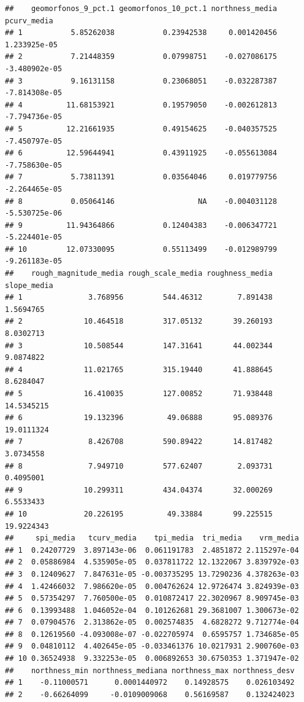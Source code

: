 \documentclass[11pt,]{article}
\begin{document}
\begin{verbatim}
##    geomorfonos_9_pct.1 geomorfonos_10_pct.1 northness_media   pcurv_media
## 1           5.85262038           0.23942538     0.001420456  1.233925e-05
## 2           7.21448359           0.07998751    -0.027086175 -3.480902e-05
## 3           9.16131158           0.23068051    -0.032287387 -7.814308e-05
## 4          11.68153921           0.19579050    -0.002612813 -7.794736e-05
## 5          12.21661935           0.49154625    -0.040357525 -7.450797e-05
## 6          12.59644941           0.43911925    -0.055613084 -7.758630e-05
## 7           5.73811391           0.03564046     0.019779756 -2.264465e-05
## 8           0.05064146                   NA    -0.004031128 -5.530725e-06
## 9          11.94364866           0.12404383    -0.006347721 -5.224401e-05
## 10         12.07330095           0.55113499    -0.012989799 -9.261183e-05
##    rough_magnitude_media rough_scale_media roughness_media slope_media
## 1               3.768956         544.46312        7.891438   1.5694765
## 2              10.464518         317.05132       39.260193   8.0302713
## 3              10.508544         147.31641       44.002344   9.0874822
## 4              11.021765         315.19440       41.888645   8.6284047
## 5              16.410035         127.00852       71.938448  14.5345215
## 6              19.132396          49.06888       95.089376  19.0111324
## 7               8.426708         590.89422       14.817482   3.0734558
## 8               7.949710         577.62407        2.093731   0.4095001
## 9              10.299311         434.04374       32.000269   6.5533433
## 10             20.226195          49.33884       99.225515  19.9224343
##     spi_media   tcurv_media    tpi_media  tri_media    vrm_media
## 1  0.24207729  3.897143e-06  0.061191783  2.4851872 2.115297e-04
## 2  0.05886984  4.535905e-05  0.037811722 12.1322067 3.839792e-03
## 3  0.12409627  7.847631e-05 -0.003735295 13.7290236 4.378263e-03
## 4  1.42466032  7.986620e-05  0.004762624 12.9726474 3.824939e-03
## 5  0.57354297  7.760500e-05  0.010872417 22.3020967 8.909745e-03
## 6  0.13993488  1.046052e-04  0.101262681 29.3681007 1.300673e-02
## 7  0.07904576  2.313862e-05  0.002574835  4.6828272 9.712774e-04
## 8  0.12619560 -4.093008e-07 -0.022705974  0.6595757 1.734685e-05
## 9  0.04810112  4.402645e-05 -0.033461376 10.0217931 2.900760e-03
## 10 0.36524938  9.332253e-05  0.006892653 30.6750353 1.371947e-02
##    northness_min northness_mediana northness_max northness_desv
## 1    -0.11000571      0.0001440972    0.14928575    0.026103492
## 2    -0.66264099     -0.0109009068    0.56169587    0.132424023

\end{verbatim}
\end{document}
